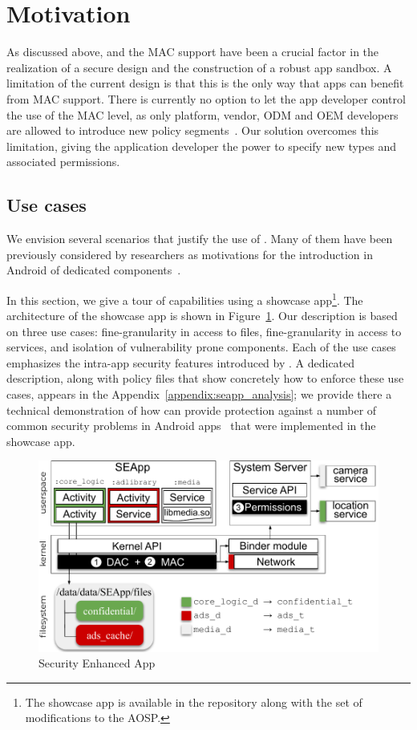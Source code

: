 \section{Motivation}\label{sect:seapp_motiv}

As discussed above, \sel and the MAC support have been a crucial
factor in the realization of a secure design and the construction of a
robust app sandbox.  A limitation of the current design is that this
is the only way that apps can benefit from MAC support.  There is
currently no option to let the app developer control the use of the
MAC level, as only platform, vendor, ODM and OEM developers are
allowed to introduce new policy
segments~\cite{seapp_sea_compatibility}.  Our solution overcomes this
limitation, giving the application developer the power to specify new
\sel types and associated permissions.

\subsection{Use cases}\label{sect:seapp_use-cases}
We envision several scenarios that justify the use of \seapp.  Many of
them have been previously considered by researchers as motivations for
the introduction in Android of dedicated
components~\cite{seapp_10.1145/2976749.2978333,
  seapp_10.1145/3292006.3300027, seapp_10.1145/3133956.3134064}.

In this section, we give a tour of \seapp capabilities using a showcase
app\footnote{The showcase app is available in the \seapp repository
  along with the set of modifications to the AOSP.}.  The architecture
of the showcase app is shown in Figure~\ref{fig:seapp_showcase}. Our
description is based on three use cases: fine-granularity in access to
files, fine-granularity in access to services, and isolation of
vulnerability prone components.  Each of the use cases emphasizes the
intra-app security features introduced by \seapp.  A dedicated
description, along with policy files that show concretely how to
enforce these use cases, appears in the
Appendix~\ref{appendix:seapp_analysis}; we provide there a technical
demonstration of how \seapp can provide protection against a number of
common security problems in Android
apps~\cite{seapp_common_play_protect_vulnerabilites} that were
implemented in the showcase app.

\begin{figure}[h]
	\centering
	\includegraphics[width=0.8\columnwidth]{chapters/seapp/figs/seapp_showcase_app}
	\caption{\label{fig:seapp_showcase} Security Enhanced App}
\end{figure}

